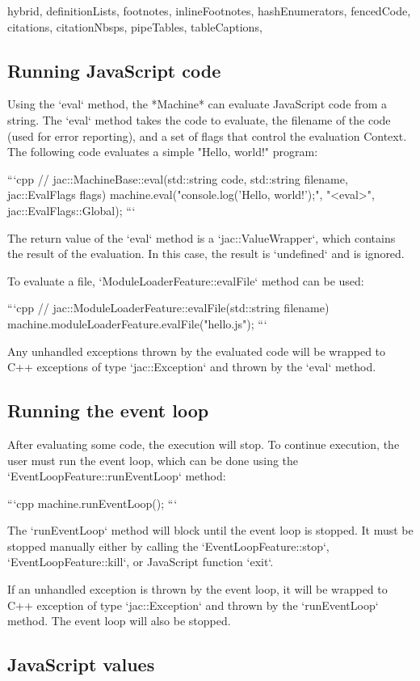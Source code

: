 \documentclass[
  digital,
  oneside,
  nosansbold,
  nocolorbold,
  lof,
  lot
]{fithesis4}
\begin{document}
\begin{markdown*}{%
  hybrid,
  definitionLists,
  footnotes,
  inlineFootnotes,
  hashEnumerators,
  fencedCode,
  citations,
  citationNbsps,
  pipeTables,
  tableCaptions,
}
\subsection{Running JavaScript code}

Using the `eval` method, the *Machine* can evaluate JavaScript code from a string. The `eval` method takes the code to evaluate, the filename of the code (used for error reporting), and a set of flags that control the evaluation Context. The following code evaluates a simple "Hello, world!" program:

```cpp
// jac::MachineBase::eval(std::string code, std::string filename, jac::EvalFlags flags)
machine.eval("console.log('Hello, world!');", "<eval>", jac::EvalFlags::Global);
```

The return value of the `eval` method is a `jac::ValueWrapper`, which contains the result of the evaluation. In this case, the result is `undefined` and is ignored.

To evaluate a file, `ModuleLoaderFeature::evalFile` method can be used:

```cpp
// jac::ModuleLoaderFeature::evalFile(std::string filename)
machine.moduleLoaderFeature.evalFile("hello.js");
```

Any unhandled exceptions thrown by the evaluated code will be wrapped to C++ exceptions of type `jac::Exception` and thrown by the `eval` method.

\subsection{Running the event loop}

After evaluating some code, the execution will stop. To continue execution, the user must run the event loop, which can be done using the `EventLoopFeature::runEventLoop` method:

```cpp
machine.runEventLoop();
```

The `runEventLoop` method will block until the event loop is stopped. It must be stopped manually either by calling the `EventLoopFeature::stop`, `EventLoopFeature::kill`, or JavaScript function `exit`.

If an unhandled exception is thrown by the event loop, it will be wrapped to C++ exception of type `jac::Exception` and thrown by the `runEventLoop` method. The event loop will also be stopped.

\subsection{JavaScript values}


\end{markdown*}
\end{document}
